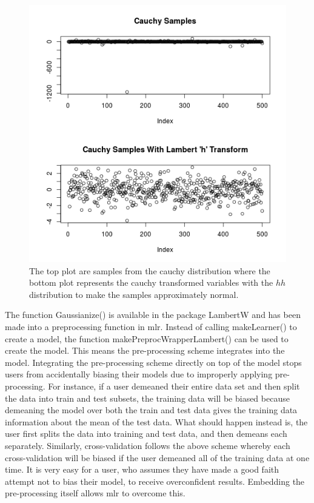 \documentclass[12pt]{article}\usepackage[]{graphicx}\usepackage[]{color}
\makeatletter
\theoremstyle{definition}
\newcommand\code{\@codex}
\def\@codex#1{{\normalfont\ttfamily\hyphenchar\font=-1 #1}}
\newcommand{\pkg}[1]{{\fontseries{b}\selectfont #1}}
\makeatother
\begin{document}
\begin{figure}[H]
\includegraphics[width=\linewidth]{cauchy_h_train.png}
\centering
\caption{The top plot are samples from the cauchy distribution where the bottom plot represents the cauchy transformed variables with the $hh$ distribution to make the samples approximately normal.}
\label{fig:cauchy_lambert}
\end{figure}

\doublespacing

The function \code{Gaussianize()} is available in the package \pkg{LambertW} and has been made into a preprocessing function in \pkg{mlr}. Instead of calling \code{makeLearner()} to create a model, the function \code{makePreprocWrapperLambert()} can be used to create the model. This means the pre-processing scheme integrates into the model. Integrating the pre-processing scheme directly on top of the model stops users from accidentally biasing their models due to improperly applying pre-processing. For instance, if a user demeaned their entire data set and then split the data into train and test subsets, the training data will be biased because demeaning the model over both the train and test data gives the training data information about the mean of the test data. What should happen instead is, the user first splits the data into training and test data, and then demeans each separately. Similarly, cross-validation follows the above scheme whereby each cross-validation will be biased if the user demeaned all of the training data at one time. It is very easy for a user, who assumes they have made a good faith attempt not to bias their model, to receive overconfident results. Embedding the pre-processing itself allows \pkg{mlr} to overcome this. 
\end{document}
